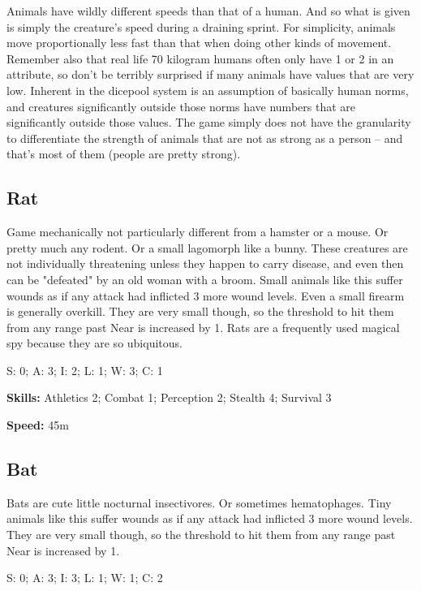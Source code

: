 Animals have wildly different speeds than that of a human. And so what is given is simply the creature's speed during a draining sprint. For simplicity, animals move proportionally less fast than that when doing other kinds of movement. Remember also that real life 70 kilogram humans often only have 1 or 2 in an attribute, so don't be terribly surprised if many animals have values that are very low. Inherent in the dicepool system is an assumption of basically human norms, and creatures significantly outside those norms have numbers that are significantly outside those values. The game simply does not have the granularity to differentiate the strength of animals that are not as strong as a person -- and that's most of them (people are pretty strong).

\subsection{Rat}
\hspace{\parindent} Game mechanically not particularly different from a hamster or a mouse. Or pretty much any rodent. Or a small lagomorph like a bunny. These creatures are not individually threatening unless they happen to carry disease, and even then can be "defeated" by an old woman with a broom. Small animals like this suffer wounds as if any attack had inflicted 3 more wound levels. Even a small firearm is generally overkill. They are very small though, so the threshold to hit them from any range past Near is increased by 1. Rats are a  frequently used magical spy because they are so ubiquitous.

S: 0; A: 3; I: 2; L: 1; W: 3; C: 1

\textbf{Skills:} Athletics 2; Combat 1; Perception 2; Stealth 4; Survival 3

\textbf{Speed:} 45m

\subsection{Bat}
\hspace{\parindent} Bats are cute little nocturnal insectivores. Or sometimes hematophages. Tiny animals like this suffer wounds as if any attack had inflicted 3 more wound levels. They are very small though, so the threshold to hit them from any range past Near is increased by 1.

S: 0; A: 3; I: 3; L: 1; W: 1; C: 2

